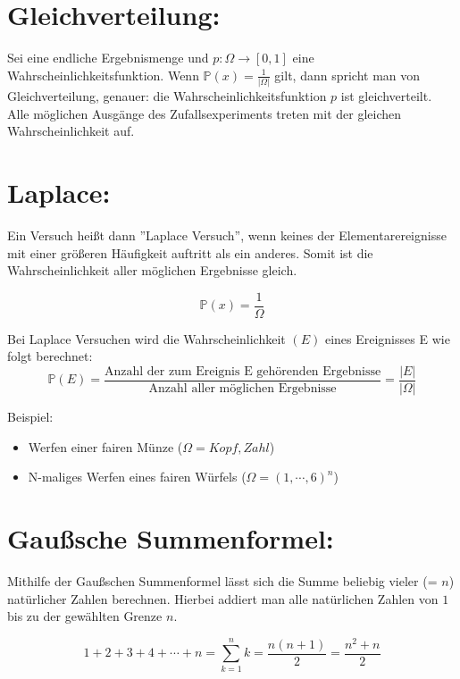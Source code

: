 \documentclass[11pt]{article}
\begin{document}
    \section{Gleichverteilung:}

    Sei \Omega eine endliche Ergebnismenge und \(p : \Omega \rightarrow [0, 1]\) eine Wahrscheinlichkeitsfunktion.
    Wenn \( \mathbb{P}(x) = \frac{1}{|\Omega|}\) gilt, dann spricht man von Gleichverteilung,
    genauer: die Wahrscheinlichkeitsfunktion \(p\) ist gleichverteilt.
    Alle möglichen Ausgänge des Zufallsexperiments treten mit der gleichen Wahrscheinlichkeit auf.


    \section{Laplace:}

    Ein Versuch heißt dann ”Laplace Versuch”, wenn keines der Elementarereignisse mit einer größeren
    Häufigkeit auftritt als ein anderes. Somit ist die Wahrscheinlichkeit aller möglichen Ergebnisse gleich.

    \[\mathbb{P}(x)= \frac{1}{\Omega}\]

    Bei Laplace Versuchen wird die Wahrscheinlichkeit \((E)\) eines Ereignisses E wie folgt berechnet:
    \[\mathbb{P}(E)= \frac{\text{Anzahl der zum Ereignis E gehörenden Ergebnisse}} {\text{Anzahl aller möglichen Ergebnisse}} = \frac{|E|} {|\Omega|}\]


    Beispiel:
    \begin{itemize}
        \item Werfen einer fairen Münze (\(\Omega= {Kopf, Zahl}\))
    \end{itemize}
    \begin{itemize}
        \item N-maliges Werfen eines fairen Würfels (\(\Omega=({1,\cdots,6}) ^n\))
    \end{itemize}


    \section{Gaußsche Summenformel: }

    Mithilfe der Gaußschen Summenformel lässt sich die Summe beliebig vieler (= \(n\)) natürlicher Zahlen berechnen.
    Hierbei addiert man alle natürlichen Zahlen von \(1\) bis zu der gewählten Grenze \(n\).

    \[1 +2 +3+ 4+ \cdots +n = \sum \limits_{k=1}^{n} k = \frac{n(n+1)}{2} = \frac {n^{2}+n}{2}\]
\end{document}
